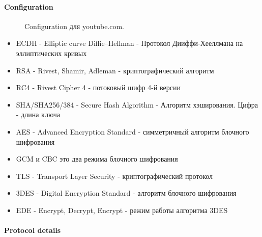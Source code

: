 \documentclass[10pt,a4paper]{report}
\begin{document}
\paragraph{Configuration\\}

\begin{figure}[h!]	
	\caption{Configuration для youtube.com.}
	\label{Img:4}
\end{figure}

\begin{itemize}
	\item{ECDH - Elliptic curve Diffie–Hellman - Протокол Дииффи-Хееллмана на эллиптических кривых}
	\item{RSA - Rivest, Shamir, Adleman - криптографический алгоритм}
	\item{RC4 - Rivest Cipher 4 -  потоковый шифр 4-й версии}
	\item{SHA/SHA256/384 - Secure Hash Algorithm - Алгоритм хэширования. Цифра - длина ключа}
	\item{AES - Advanced Encryption Standard - симметричный алгоритм блочного шифрования}
	\item{GCM и CBC это два режима блочного шифрования}
	\item{TLS - Transport Layer Security - криптографический протокол}
	\item{3DES - Digital Encryption Standard - алгоритм блочного шифрования}
	\item{EDE - Encrypt, Decrypt, Encrypt - режим работы алгоритма 3DES}
\end{itemize}

\paragraph{Protocol details\\}
\end{document}
